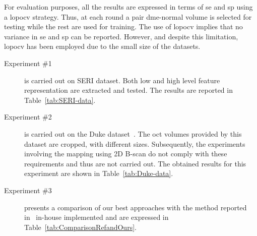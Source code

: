 For evaluation purposes, all the results are expressed in terms of \ac{se} and \ac{sp} using a \ac{lopocv} strategy.
Thus, at each round a pair \ac{dme}-normal volume is selected for testing while the rest are used for training.
The use of \ac{lopocv} implies that no variance in \ac{se} and \ac{sp} can be reported.
However, and despite this limitation, \ac{lopocv} has been employed due to the small size of the datasets. 

\begin{description}

\item[Experiment \#1] is carried out on SERI dataset. Both low and high level feature representation are extracted and tested. The results are reported in Table~\ref{tab:SERI-data}.

\item[Experiment \#2] is carried out on the Duke dataset~\cite{Srinivasan2014}. The \ac{oct} volumes provided by this dataset are cropped, with different sizes.
Subsequently, the experiments involving the mapping using 2D B-scan do not comply with these requirements and thus are not carried out.
The obtained results for this experiment are shown in Table~\ref{tab:Duke-data}.

\item[Experiment \#3] presents a comparison of our best approaches with the method reported in~\cite{Venhuizen2015} in-house implemented and are expressed in Table~\ref{tab:ComparisonRefandOurs}.

\end{description}

